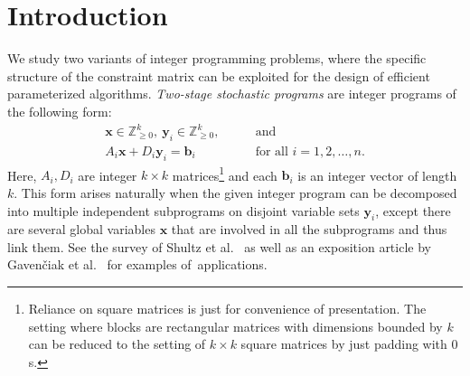\documentclass{article}
\renewcommand{\geq}{\geqslant}
\newcommand{\Z}{\mathbb{Z}}
\newcommand{\Zn}{\Z_{\geq 0}}
\newcommand{\tup}[1]{{\mathbf{#1}}}
\newcommand{\xx}{\tup x}
\newcommand{\yy}{\tup y}
\newcommand{\bb}{\tup b}
\begin{document}
\begin{abstract}
In both results, we depart from the approach that relies purely on Graver bases. Instead, for two-stage stochastic programs, we devise a reduction to integer programming with a bounded number of variables using new insights about the combinatorics of integer cones.
For $n$-fold programs, we reduce a given $n$-fold program to an exponential-size program with bounded right-hand sides, which we consequently solve using a reduction to mixed integer programming with a bounded number of integral variables.
For $n$-fold programs, we reduce a given $n$-fold program to an exponential-size program with bounded right-hand sides, which we consequently solve using a reduction to mixed integer programming with a bounded number of integral variables.
\end{abstract}

\section{Introduction}\label{sec:intro}

We study two variants of integer programming problems, where the specific structure of the constraint matrix can be exploited for the design of efficient parameterized algorithms. {\em{Two-stage stochastic programs}} are integer programs of the following form:
\begin{align}
 \xx\in \Zn^k,\ \yy_i\in \Zn^k, &\qquad  \textrm{and}\nonumber\\
 A_i\xx + D_i\yy_i =\bb_i &\qquad \textrm{for all }i=1,2,\ldots,n.\tag{$\spadesuit$}\label{eq:twostage-form}
\end{align}
Here, $A_i,D_i$ are integer $k\times k$ matrices\footnote{Reliance on square matrices is just for convenience of presentation. The setting where blocks are rectangular matrices with dimensions bounded by $k$ can be reduced to the setting of $k\times k$ square matrices by just padding with $0$s.} and each $\bb_i$ is an integer vector of length $k$. This form arises naturally when the given integer program can be decomposed into multiple independent subprograms on disjoint variable sets $\yy_i$, except there are several global variables $\xx$ that are involved in all the subprograms and thus link them. See the survey of Shultz et al.~\cite{SchultzSvdV96} as well as an exposition article by Gaven\v{c}iak et al.~\cite{GavenciakKK22} for examples of~applications.
\end{document}
